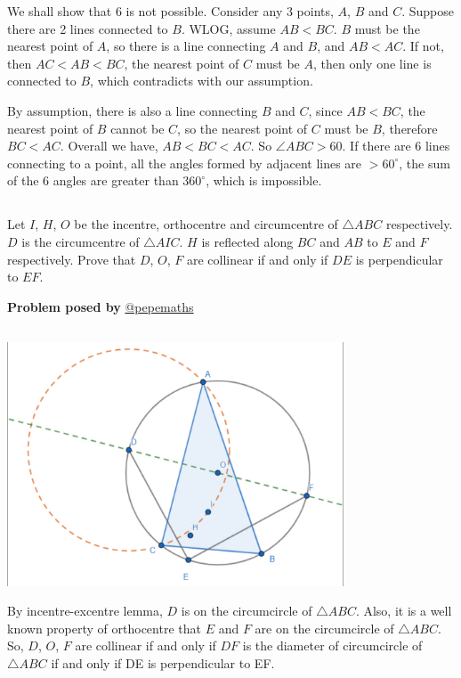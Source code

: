 \documentclass[12pt]{article}
\begin{document}
We shall show that $6$ is not possible. Consider any $3$ points, $A$, $B$ and $C$.  Suppose there are 2 lines connected to $B$. WLOG, assume $AB<BC$.  $B$ must be the nearest point of $A$, so there is a line connecting $A$ and $B$, and $AB<AC$. If not, then $AC<AB<BC$, the nearest point of $C$ must be $A$, then only one line is connected to $B$, which contradicts with our assumption.

By assumption, there is also a line connecting $B$ and $C$, since $AB<BC$, the nearest point of $B$ cannot be $C$, so the nearest point of $C$ must be $B$, therefore $BC<AC$. Overall we have, $AB<BC<AC$. So $\angle ABC>60$. If there are 6 lines connecting to a point, all the angles formed by adjacent lines are $>60^{\circ}$, the sum of the 6 angles are greater than $360^{\circ}$, which is impossible.


\subsection*{}
Let $I$, $H$, $O$ be the incentre, orthocentre and circumcentre of $\triangle ABC$ respectively. $D$ is the circumcentre of $\triangle AIC$. $H$ is reflected along $BC$ and $AB$ to $E$ and $F$ respectively. Prove that $D$, $O$, $F$ are collinear if and only if $DE$ is perpendicular to $EF$.

\begin{flushright}
\textbf{Problem posed by}
\textcolor{RoyalBlue2}{\href{https://www.instagram.com/pepemaths/}{@pepemaths}}
\end{flushright}

\subsection*{}
\begin{center}
    \includegraphics[width = 10cm]{Figure 5.png}
\end{center}
By incentre-excentre lemma, $D$ is on the circumcircle of $\triangle ABC$. Also, it is a well known property of orthocentre that $E$ and $F$ are on the circumcircle of $\triangle ABC$. So, $D$, $O$, $F$ are collinear if and only if $DF$ is the diameter of circumcircle of $\triangle ABC$ if and only if DE is perpendicular to EF.
\end{document}
